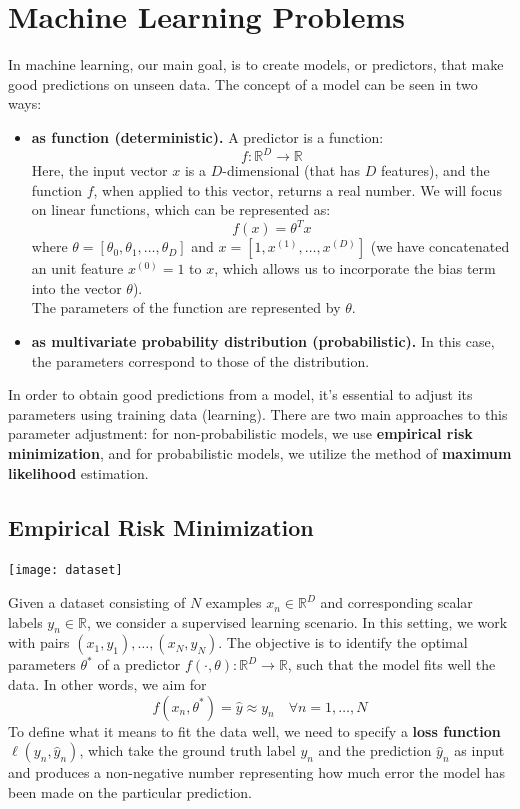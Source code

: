 \documentclass{article}
\begin{document}
\section{Machine Learning Problems}
In machine learning, our main goal, is to create models, or predictors,
that make good predictions on unseen data. The concept of a model can be seen
in two ways:
\begin{itemize}
    \item \textbf{as function (deterministic).} A predictor is a function:
        $$f:\mathbb{R}^D\to \mathbb{R}$$
        Here, the input vector $x$ is a $D$-dimensional (that has $D$
        features), and the function $f$, when applied to this vector, returns
        a real number. We will focus on linear functions, which can be
        represented as:
        $$f(x)=\theta^Tx$$
        where $\theta=[\theta_0,\theta_1,\ldots,\theta_D]$ and
        $x=[1,x^{(1)},\ldots,x^{(D)}]$ (we have concatenated an unit feature
        $x^{(0)}=1$ to $x$, which allows us to incorporate the bias term into
        the vector $\theta$).\\
        The parameters of the function are represented by $\theta$.
    \item \textbf{as multivariate probability distribution (probabilistic).}
        In this case, the parameters correspond to those of the distribution.
\end{itemize}
In order to obtain good predictions from a model, it's essential to adjust its
parameters using training data (learning). There are two main approaches to this
parameter adjustment: for non-probabilistic models, we use \textbf{empirical
risk minimization}, and for probabilistic models, we utilize the method of
\textbf{maximum likelihood} estimation.
\subsection{Empirical Risk Minimization}
\begin{center}
    \texttt{[image: dataset]}
\end{center}
Given a dataset consisting of $N$ examples $x_n \in \mathbb{R}^D$ and
corresponding scalar labels $y_n \in \mathbb{R}$, we consider a supervised
learning scenario. In this setting, we work with pairs $(x_1, y_1), \ldots,
(x_N, y_N)$. The objective is to identify the optimal parameters $\theta^*$ of
a predictor $f(\cdot,\theta):\mathbb{R}^D\to \mathbb{R}$, such that the model
fits well the data. In other words, we aim for 
$$f(x_n,\theta^*)=\hat{y}\approx y_n\quad\forall n=1,\ldots,N$$
To define what it means to fit the data well, we need to specify a \textbf{loss
function} $\ell(y_n,\hat{y}_n)$, which take the ground truth label $y_n$ and
the prediction $\hat{y}_n$ as input and produces a non-negative number representing how
much error the model has been made on the particular prediction.
\end{document}
